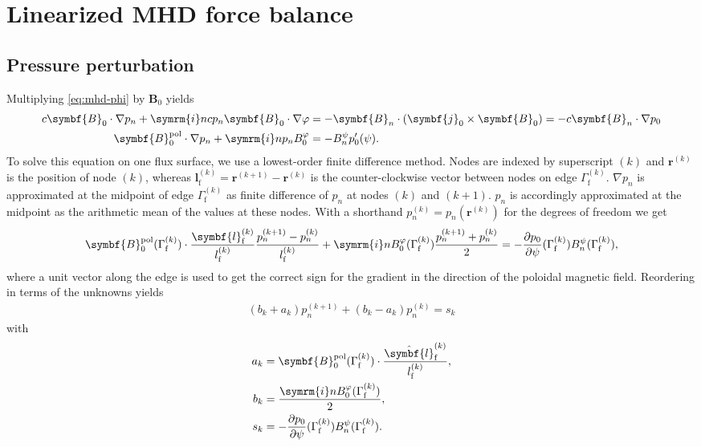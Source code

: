 \documentclass[a4paper, 10pt, english]{article}
\let\temp\varrho
\let\varrho\rho
\let\rho\temp
\let\temp\vartheta
\let\vartheta\theta
\let\theta\temp
\let\temp\varphi
\let\varphi\phi
\let\phi\temp
\let\vec\symbf
\newcommand*\im{\ensuremath{\symrm{i}}}  %
\newcommand*\pd[2][]{\ensuremath{\frac{\partial #1}{\partial #2}}}  %
\newcommand*\pol{\ensuremath{\textrm{pol}}}  %
\newcommand*\fs{\ensuremath{\textrm{f}}}  %
\begin{document}
\section{Linearized MHD force balance}

\subsection{Pressure perturbation}

Multiplying \cref{eq:mhd-phi} by $\vec{B}_{0}$ yields
\begin{align}
  c \vec{B}_{0} \cdot \nabla p_{n} + \im n c p_{n} \vec{B}_{0} \cdot \nabla \phi &= -\vec{B}_{n} \cdot (\vec{j}_{0} \times \vec{B}_{0}) = -c \vec{B}_{n} \cdot \nabla p_{0} \nonumber \\
  \vec{B}_{0}^{\pol} \cdot \nabla p_{n} + \im n p_{n} B_{0}^{\phi} &= -B_{n}^{\psi} p_{0}'(\psi). \label{eq:pn}
\end{align}
To solve this equation on one flux surface, we use a lowest-order finite difference method. Nodes are indexed by superscript $(k)$ and $\vec{r}^{(k)}$ is the position of node $(k)$, whereas $\vec{l}_{\fs}^{(k)} = \vec{r}^{(k+1)} - \vec{r}^{(k)}$ is the counter-clockwise vector between nodes on edge $\Gamma_{\fs}^{(k)}$. $\nabla p_{n}$ is approximated at the midpoint of edge $\Gamma_{\fs}^{(k)}$ as finite difference of $p_{n}$ at nodes $(k)$ and $(k+1)$. $p_{n}$ is accordingly approximated at the midpoint as the arithmetic mean of the values at these nodes. With a shorthand $p_{n}^{(k)} = p_{n} (\vec{r}^{(k)})$ for the degrees of freedom we get
\begin{gather}
  \vec{B}_{0}^{\pol} (\Gamma_{\fs}^{(k)}) \cdot \frac{\vec{l}_{\fs}^{(k)}}{l_{\fs}^{(k)}} \frac{p_{n}^{(k+1)} - p_{n}^{(k)}}{l_{\fs}^{(k)}} + \im n B_{0}^{\phi} (\Gamma_{\fs}^{(k)}) \frac{p_{n}^{(k+1)} + p_{n}^{(k)}}{2} = -\pd[p_{0}]{\psi} (\Gamma_{\fs}^{(k)}) B_{n}^{\psi} (\Gamma_{\fs}^{(k)}),
\end{gather}
where a unit vector along the edge is used to get the correct sign for the gradient in the direction of the poloidal magnetic field. Reordering in terms of the unknowns yields
\begin{gather}
  (b_{k} + a_{k}) p_{n}^{(k+1)} + (b_{k} - a_{k}) p_{n}^{(k)} = s_{k}
\end{gather}
with
\begin{align}
  a_{k} &= \vec{B}_{0}^{\pol} (\Gamma_{\fs}^{(k)}) \cdot \frac{\hat{\vec{l}}_{\fs}^{(k)}}{l_{\fs}^{(k)}}, \\
  b_{k} &= \frac{\im n B_{0}^{\phi} (\Gamma_{\fs}^{(k)})}{2}, \\
  s_{k} &= -\pd[p_{0}]{\psi} (\Gamma_{\fs}^{(k)}) B_{n}^{\psi} (\Gamma_{\fs}^{(k)}).
\end{align}
\end{document}
